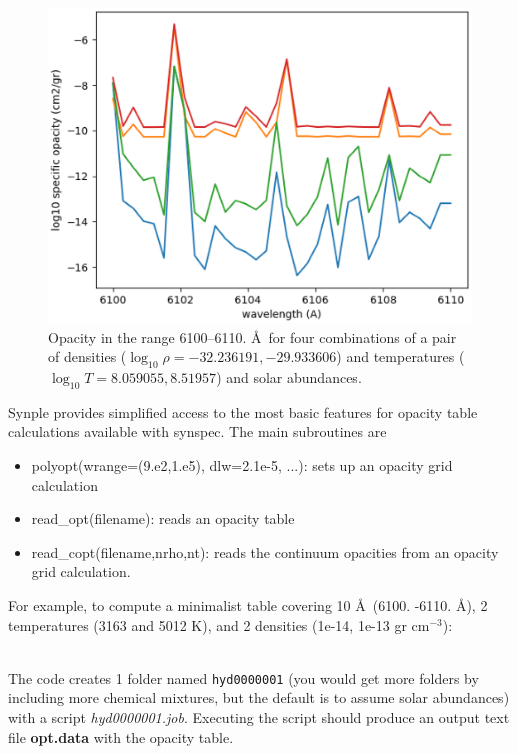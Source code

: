 \documentclass[]{article}
\begin{document}
\begin{figure}[t!]
\centering
\includegraphics[width=14cm]{Figure_7.ps}
\caption{Opacity in the range 6100--6110. \AA\ for four combinations of a pair of densities ($\log_{10} \rho = -32.236191, -29.933606$) and temperatures ($\log_{10} T = 8.059055, 8.51957$) and solar abundances.
\label{opacity-fig}
}
\end{figure}

Synple provides simplified access to the most basic features for opacity table calculations available with synspec. The main subroutines are

\begin{itemize}
\item polyopt(wrange=(9.e2,1.e5), dlw=2.1e-5, ...): sets up an opacity grid calculation
\item read\_opt(filename): reads an opacity table 
\item read\_copt(filename,nrho,nt): reads the continuum opacities from an opacity grid calculation.
\end{itemize}

For example, to compute a minimalist table covering 10 \AA\ (6100. -6110. \AA), 2 temperatures (3163 and 5012 K), and 2 densities (1e-14, 1e-13 gr cm$^{-3}$):

\\

The code creates 1 folder named {\tt hyd0000001} (you would get more folders by 
including more chemical mixtures, but the default is to assume solar abundances) 
with a script {\it hyd0000001.job}. Executing the script should produce an output text file {\bf opt.data} with the opacity table.
\end{document}
